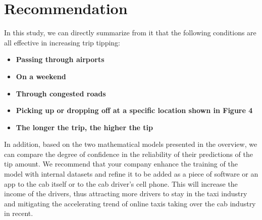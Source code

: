 \documentclass[11pt]{article}
\begin{document}
\section{Recommendation}
In this study, we can directly summarize from it that the following conditions are all effective in increasing trip tipping:
\begin{itemize}


    \item \textbf{Passing through airports}
    \item \textbf{On a weekend}
    \item \textbf{Through congested roads}
    \item \textbf{Picking up or dropping off at a specific location shown in Figure 4}
    \item \textbf{The longer the trip, the higher the tip}
\end{itemize} 
In addition, based on the two mathematical models presented in the overview, we can compare the degree of confidence in the reliability of their predictions of the tip amount. We recommend that your company enhance the training of the model with internal datasets and refine it to be added as a piece of software or an app to the cab itself or to the cab driver's cell phone. This will increase the income of the drivers, thus attracting more drivers to stay in the taxi industry and mitigating the accelerating trend of online taxis taking over the cab industry in recent. 

\clearpage

\printbibliography
\end{document}
